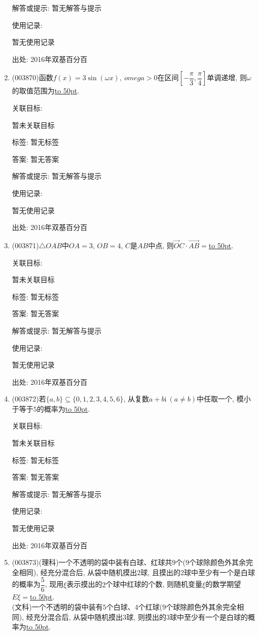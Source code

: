 \documentclass[10pt,a4paper]{article}
\newcommand{\blank}[1]{\underline{\hbox to #1pt{}}}
\begin{document}
\begin{enumerate}[1.]
解答或提示: 暂无解答与提示

使用记录:

暂无使用记录


出处: 2016年双基百分百
\item { (003870)}函数$f(x)=3\sin (\omega x), \ omega>0$在区间$\left[-\dfrac{\pi}{3},\dfrac{\pi}{4}\right]$单调递增, 则$\omega$的取值范围为\blank{50}.


关联目标:

暂未关联目标



标签: 暂无标签

答案: 暂无答案

解答或提示: 暂无解答与提示

使用记录:

暂无使用记录


出处: 2016年双基百分百
\item { (003871)}$\triangle OAB$中$OA=3$, $OB=4$, $C$是$AB$中点, 则$\overrightarrow OC\cdot \overrightarrow{AB}=$\blank{50}.


关联目标:

暂未关联目标



标签: 暂无标签

答案: 暂无答案

解答或提示: 暂无解答与提示

使用记录:

暂无使用记录


出处: 2016年双基百分百
\item { (003872)}若$\{a,b\}\subseteq \{0,1,2,3,4,5,6\}$, 从复数$a+b\mathrm{i} \ (a\ne b)$中任取一个, 模小于等于$5$的概率为\blank{50}.


关联目标:

暂未关联目标



标签: 暂无标签

答案: 暂无答案

解答或提示: 暂无解答与提示

使用记录:

暂无使用记录


出处: 2016年双基百分百
\item { (003873)}(理科)一个不透明的袋中装有白球、红球共$9$个($9$个球除颜色外其余完全相同), 经充分混合后, 从袋中随机摸出$2$球, 且摸出的$2$球中至少有一个是白球的概率为$\dfrac 56$, 现用$\xi$表示摸出的$2$个球中红球的个数, 则随机变量$\xi$的数学期望$E\xi=$\blank{50}.\\
(文科)一个不透明的袋中装有$5$个白球、$4$个红球($9$个球除颜色外其余完全相同), 经充分混合后, 从袋中随机摸出$3$球, 则摸出的$3$球中至少有一个是白球的概率为\blank{50}.



\end{enumerate}
\end{document}
